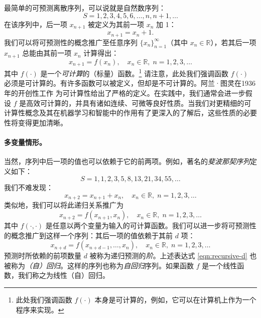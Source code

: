 \documentclass[../../book-main.tex]{subfiles}
\begin{document}
最简单的可预测离散序列，可以说就是自然数序列：
\begin{equation}
   {S} =  1, 2, 3, 4, 5, 6, \ldots, n, n+1, \ldots
\end{equation}
在该序列中，后一项 $x_{n+1}$ 被定义为其前一项 $x_n$ 加 1：
\begin{equation}
x_{n+1} = x_n + 1.    
\end{equation}
我们可以将可预测性的概念推广至任意序列 $\{x_n\}_{n=1}^\infty$（其中 $ x_n \in \mathbb{R}$），若其后一项 $x_{n+1}$ 总能由其前一项 $x_n$ 计算得出：
\begin{equation}
    x_{n+1} = f(x_{n}), \quad x_n \in \mathbb{R}, \; n =  1, 2, 3, \ldots
\end{equation}
其中 $f(\cdot)$ 是一个{\em 可计算}的（标量）函数。\footnote{此处我们强调函数 $f(\cdot)$ 本身是可计算的，例如，它可以在计算机上作为一个程序来实现。} 请注意，此处我们强调函数 $f(\cdot)$ 必须是可计算的。有许多函数可以被定义，但却是不可计算的。阿兰·图灵在1936年的开创性工作 \cite{Turing-1936} 为可计算性给出了严格的定义。在实践中，我们通常会进一步假设 $f$ 是高效可计算的，并具有诸如连续、可微等良好性质。当我们对更精细的可计算性概念及其在机器学习和智能中的作用有了更深入的了解后，这些性质的必要性将变得更加清晰。

\paragraph{多变量情形。}
当然，序列中后一项的值也可以依赖于它的前两项。例如，著名的{\em 斐波那契序列}定义如下：
\begin{equation}
    {S} = 1, 1, 2, 3, 5, 8, 13, 21, 34, 55, \ldots
\end{equation}
我们不难发现：
\begin{equation}
    x_{n+2} = x_{n+1} + x_{n}, \quad  x_n \in \mathbb{R}, \;  n = 1, 2, 3, \ldots
\end{equation}
类似地，我们可以将此递归关系推广为
\begin{equation}
    x_{n+2} = f(x_{n+1}, x_{n}), \quad x_n \in \mathbb{R}, \;  n =  1, 2, 3, \ldots
\end{equation}
其中 $f(\cdot,\cdot)$ 是任意以两个变量为输入的可计算函数。我们可以进一步将可预测性的概念推广到这样一个序列：其后一项的值依赖于其前 $d$ 项：
\begin{equation}
    x_{n+d} = f(x_{n+d-1}, \ldots,  x_{n}), \quad  x_n \in \mathbb{R}, \; n =  1, 2, 3, \ldots
    \label{eqn:recursive-d}
\end{equation}
预测时所依赖的前项数量 $d$ 被称为递归预测的{\em 阶}。上述表达式 \eqref{eqn:recursive-d} 也被称为{\em （自）回归}。这样的序列也称为{\em 自回归}序列。如果函数 $f$ 是一个线性函数，我们称之为线性（自）回归。
\end{document}
